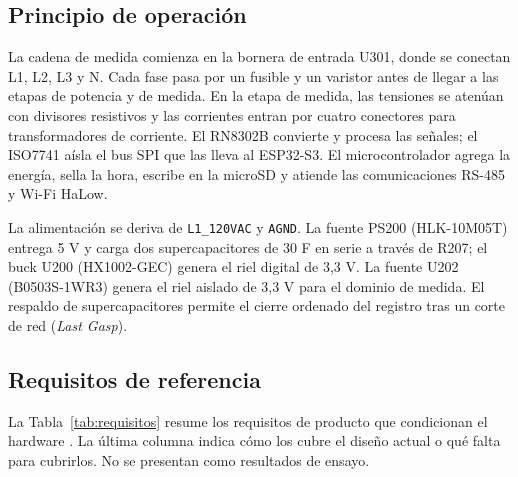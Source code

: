 \documentclass[11pt,a4paper]{article}
\begin{document}
\subsection{Principio de operación}

La cadena de medida comienza en la bornera de entrada U301, donde se conectan
L1, L2, L3 y N. Cada fase pasa por un fusible y un varistor antes de llegar a
las etapas de potencia y de medida. En la etapa de medida, las tensiones se
atenúan con divisores resistivos y las corrientes entran por cuatro conectores
para transformadores de corriente. El RN8302B convierte y procesa las señales;
el ISO7741 aísla el bus SPI que las lleva al ESP32-S3. El microcontrolador
agrega la energía, sella la hora, escribe en la microSD y atiende las
comunicaciones RS-485 y Wi-Fi HaLow.

La alimentación se deriva de \texttt{L1\_120VAC} y \texttt{AGND}. La fuente
PS200 (HLK-10M05T) entrega 5 V y carga dos supercapacitores de 30 F en serie a
través de R207; el buck U200 (HX1002-GEC) genera el riel digital de 3,3 V. La
fuente U202 (B0503S-1WR3) genera el riel aislado de 3,3 V para el dominio de
medida. El respaldo de supercapacitores permite el cierre ordenado del registro
tras un corte de red (\emph{Last Gasp}).

\subsection{Requisitos de referencia}

La Tabla~\ref{tab:requisitos} resume los requisitos de producto que condicionan
el hardware \cite{rdem01}. La última columna indica cómo los cubre el diseño
actual o qué falta para cubrirlos. No se presentan como resultados de ensayo.
\end{document}
